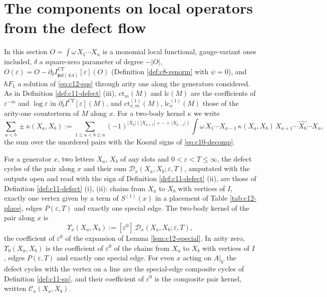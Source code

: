 \section{The components on local operators from the defect flow}

In this section $O=\int\omega\,X_1\cdots X_n$ is a monomial local functional, gauge-variant ones included, $\delta$ a square-zero parameter of degree $-|O|$, $O(\varepsilon)=O-\partial_\delta I^{CT}_{\mathfrak{psl}(4|4)}[\varepsilon](O)$ (Definition \ref{def:c8-renorm} with $\psi=0$), and $\hbar F_1$ a solution of \eqref{eq:c12-eqs} through arity one along the generators considered. As in Definition \ref{def:c11-defect} (iii), $\mathrm{ct}_m(M)$ and $\mathrm{lc}(M)$ are the coefficients of $\varepsilon^{-m}$ and $\log\varepsilon$ in $\partial_\delta I^{CT}[\varepsilon](M)$, and $\mathrm{ct}^{(1)}_{x,m}(M)$, $\mathrm{lc}^{(1)}_x(M)$ those of the arity-one counterterm of $M$ along $x$. For a two-body kernel $\kappa$ we write
\begin{equation}
\sum_{a<b}\pm\kappa(X_a,X_b):=\sum_{1\le a<b\le n}(-1)^{|X_b|(|X_{a+1}|+\cdots+|X_{b-1}|)}\int\omega\,X_1\cdots X_{a-1}\,\kappa(X_a,X_b)\,X_{a+1}\cdots\widehat{X_b}\cdots X_n,
\label{eq:c12-pairsum}
\end{equation}
the sum over the unordered pairs with the Koszul signs of \eqref{eq:c10-decomp}.

\begin{definition}
\label{def:c12-kernel}
For a generator $x$, two letters $X_a$, $X_b$ of any slots and $0<\varepsilon<T\le\infty$, the defect cycles of the pair along $x$ and their sum $\mathcal D_x(X_a,X_b;\varepsilon,T)$, amputated with the outputs open and read with the sign of Definition \ref{def:c11-defect} (ii), are those of Definition \ref{def:c11-defect} (i), (ii): chains from $X_a$ to $X_b$ with vertices of $I$, exactly one vertex given by a term of $S^{(1)}(x)$ in a placement of Table \ref{tab:c12-place}, edges $P(\varepsilon,T)$ and exactly one special edge. The two-body kernel of the pair along $x$ is
\begin{equation}
\Upsilon_x(X_a,X_b):=[\varepsilon^0]\,\mathcal D_x(X_a,X_b;\varepsilon,T),
\label{eq:c12-kernel}
\end{equation}
the coefficient of $\varepsilon^0$ of the expansion of Lemma \ref{lem:c12-special}. In arity zero, $\Upsilon_0(X_a,X_b)$ is the coefficient of $\varepsilon^0$ of the chains from $X_a$ to $X_b$ with vertices of $I$, edges $P(\varepsilon,T)$ and exactly one special edge. For even $x$ acting on $A|_V$ the defect cycles with the vertex on a line are the special-edge composite cycles of Definition \ref{def:c11-sp}, and their coefficient of $\varepsilon^0$ is the composite pair kernel, written $\mathcal C_x(X_a,X_b)$.
\end{definition}

